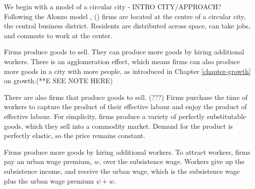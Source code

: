We begin with a model of a circular city - INTRO CITY/APPROACH?
Following the \gls{Alonzo model} \cite{alonzoTheoryUrbanLand1960}, (\cite{alonsoLocationLandUse1964}) firms are located at the centre of a circular city, the central business district. Residents are distributed across space, can take jobs, and commute to work at the center. 

Firms produce goods to sell. They can produce more goods by hiring additional workers. 
There is an agglomeration effect, which means firms can also produce more goods %
in a city with more people, as introduced in Chapter \ref{chapter-growth} on growth.(**E SEE NOTE HERE) %

There are also firms that produce goods to sell. (???) %
Firms purchase the time of workers to capture the product of their effective labour and enjoy the product of \gls{effective labour}. 
For simplicity, firms produce a variety of perfectly \gls{substitutable} goods, which they sell into a commodity market. %
Demand for the \gls{product} is \gls{perfectly elastic}, so the price remains constant.

Firms produce more goods by hiring additional workers. To attract workers, firms pay an \gls{urban wage premium}, $w$, over the subsistence wage. 
Workers give up the subsistence income, and receive the \gls{urban wage}, which is the subsistence wage plus the urban wage premium $\psi + w$.

